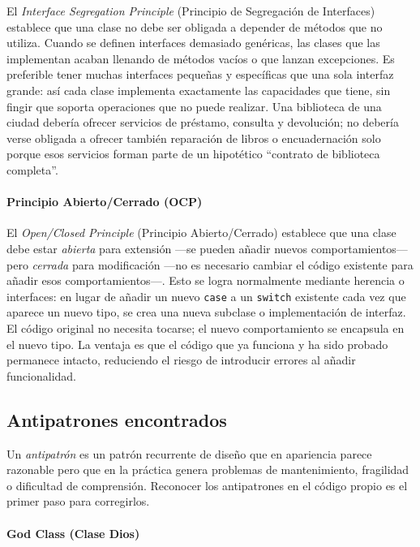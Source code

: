 \documentclass[11pt,a4paper]{article}
\newcommand{\code}[1]{\texttt{#1}}
\begin{document}
El \emph{Interface Segregation Principle} (Principio de Segregación de Interfaces)
establece que una clase no debe ser obligada a depender de métodos que no
utiliza.  Cuando se definen interfaces demasiado genéricas, las clases que las
implementan acaban llenando de métodos vacíos o que lanzan excepciones.  Es
preferible tener muchas interfaces pequeñas y específicas que una sola interfaz
grande: así cada clase implementa exactamente las capacidades que tiene, sin
fingir que soporta operaciones que no puede realizar.  Una biblioteca de una
ciudad debería ofrecer servicios de préstamo, consulta y devolución; no debería
verse obligada a ofrecer también reparación de libros o encuadernación solo
porque esos servicios forman parte de un hipotético ``contrato de biblioteca
completa''.

\label{sec:fund-ocp}
\paragraph{Principio Abierto/Cerrado (OCP)}

El \emph{Open/Closed Principle} (Principio Abierto/Cerrado) establece que una
clase debe estar \emph{abierta} para extensión ---se pueden añadir nuevos
comportamientos--- pero \emph{cerrada} para modificación ---no es necesario
cambiar el código existente para añadir esos comportamientos---.  Esto se logra
normalmente mediante herencia o interfaces: en lugar de añadir un nuevo
\code{case} a un \code{switch} existente cada vez que aparece un nuevo tipo,
se crea una nueva subclase o implementación de interfaz.  El código original
no necesita tocarse; el nuevo comportamiento se encapsula en el nuevo tipo.
La ventaja es que el código que ya funciona y ha sido probado permanece intacto,
reduciendo el riesgo de introducir errores al añadir funcionalidad.

\subsection{Antipatrones encontrados}
\label{sec:fund-antipatrones}

Un \emph{antipatrón} es un patrón recurrente de diseño que en apariencia
parece razonable pero que en la práctica genera problemas de mantenimiento,
fragilidad o dificultad de comprensión.  Reconocer los antipatrones en el
código propio es el primer paso para corregirlos.

\label{sec:fund-god-class}
\paragraph{God Class (Clase Dios)}
\end{document}
